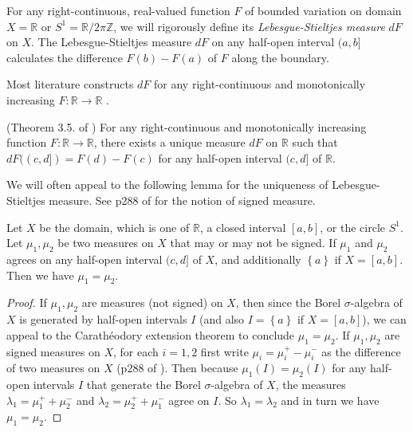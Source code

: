 For any right-continuous, real-valued function \(F\) of bounded variation on domain \(X = \mathbb{R}\) or \(S^1 = \mathbb{R} / 2\pi \mathbb{Z}\), we will rigorously define its \emph{Lebesgue-Stieltjes measure} \(dF\) on \(X\). The Lebesgue-Stieltjes measure \(dF\) on any half-open interval \((a, b]\) calculates the difference \(F(b) - F(a)\) of \(F\) along the boundary.

Most literature constructs \(dF\) for any right-continuous and monotonically increasing \(F : \mathbb{R} \to \mathbb{R}\) \autocite{steinRealAnalysisMeasure2005,hewittRealAbstractAnalysis2013,halmos2013measure}.

\begin{theorem}

(Theorem 3.5. of \autocite{steinRealAnalysisMeasure2005}) For any right-continuous and monotonically increasing function \(F : \mathbb{R} \to \mathbb{R}\), there exists a unique measure \(dF\) on \(\mathbb{R}\) such that \(dF((c, d]) = F(d) - F(c)\) for any half-open interval \((c, d]\) of \(\mathbb{R}\).

\label{thm:lebesgue-stieltjes}
\end{theorem}

We will often appeal to the following lemma for the uniqueness of Lebesgue-Stieltjes measure. See p288 of \autocite{steinRealAnalysisMeasure2005} for the notion of signed measure.

\begin{lemma}

Let \(X\) be the domain, which is one of \(\mathbb{R}\), a closed interval \([a, b]\), or the circle \(S^1\). Let \(\mu_1, \mu_2\) be two measures on \(X\) that may or may not be signed. If \(\mu_1\) and \(\mu_2\) agrees on any half-open interval \((c, d]\) of \(X\), and additionally \(\left\{ a \right\}\) if \(X = [a, b]\). Then we have \(\mu_1 = \mu_2\).

\label{lem:measure-interval-uniqueness}
\end{lemma}

\begin{proof}
If \(\mu_1, \mu_2\) are measures (not signed) on \(X\), then since the Borel \(\sigma\)-algebra of \(X\) is generated by half-open intervals \(I\) (and also \(I = \left\{ a \right\}\) if \(X = [a, b]\)), we can appeal to the Carathéodory extension theorem to conclude \(\mu_1 = \mu_2\). If \(\mu_1, \mu_2\) are signed measures on \(X\), for each \(i=1, 2\) first write \(\mu_i = \mu_i^+ - \mu_i^-\) as the difference of two measures on \(X\) (p288 of \autocite{steinRealAnalysisMeasure2005}). Then because \(\mu_1(I) = \mu_2(I)\) for any half-open intervals \(I\) that generate the Borel \(\sigma\)-algebra of \(X\), the measures \(\lambda_1 = \mu_1^+ + \mu_2^-\) and \(\lambda_2 = \mu_2^+ + \mu_1^-\) agree on \(I\). So \(\lambda_1 = \lambda_2\) and in turn we have \(\mu_1 = \mu_2\).
\end{proof}

